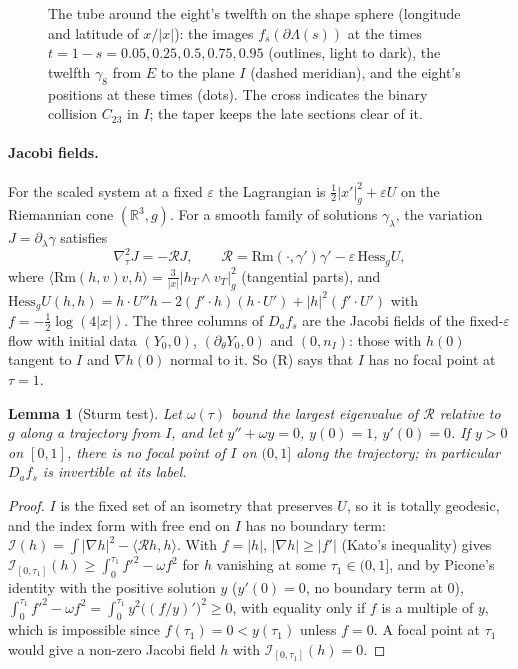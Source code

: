 \documentclass[11pt]{article}
\newtheorem{lemma}[theorem]{Lemma}
\theoremstyle{definition}
\begin{document}
\begin{figure}[t]\centering
\figtube
\caption{The tube around the eight's twelfth on the shape sphere (longitude and latitude of $x/|x|$): the images
$f_s(\partial\Lambda(s))$ at the times $t=1-s=0.05,0.25,0.5,0.75,0.95$ (outlines, light to dark), the twelfth
$\gamma_8$ from $E$ to the plane $I$ (dashed meridian), and the eight's positions at these times (dots). The cross
indicates the binary collision $C_{23}$ in $I$; the taper keeps the late sections clear of it.}\label{fig:tube}
\end{figure}

\paragraph{Jacobi fields.} For the scaled system at a fixed $\varepsilon$ the Lagrangian is
$\tfrac12|x'|_g^2+\varepsilon U$ on the Riemannian cone $(\mathbb R^3,g)$. For a smooth family of solutions
$\gamma_\lambda$, the variation $J=\partial_\lambda\gamma$ satisfies
\[
\nabla_\tau^2J=-\mathcal R J,\qquad \mathcal R=\mathrm{Rm}(\cdot,\gamma')\gamma'-\varepsilon\,\mathrm{Hess}_gU,
\]
where $\langle\mathrm{Rm}(h,v)v,h\rangle=\frac3{|x|}|h_T\wedge v_T|_g^2$ (tangential parts), and
$\mathrm{Hess}_gU(h,h)=h\cdot U''h-2(f'\cdot h)(h\cdot U')+|h|^2(f'\cdot U')$ with $f=-\tfrac12\log(4|x|)$. The three
columns of $D_af_s$ are the Jacobi fields of the fixed-$\varepsilon$ flow with initial data $(Y_0,0)$,
$(\partial_\theta Y_0,0)$ and $(0,n_I)$: those with $h(0)$ tangent to $I$ and $\nabla h(0)$ normal to it. So (R) says
that $I$ has no focal point at $\tau=1$.

\begin{lemma}[Sturm test]\label{lem:sturm}
Let $\omega(\tau)$ bound the largest eigenvalue of $\mathcal R$ relative to $g$ along a trajectory from $I$, and let
$y''+\omega y=0$, $y(0)=1$, $y'(0)=0$. If $y>0$ on $[0,1]$, there is no focal point of $I$ on $(0,1]$ along the
trajectory; in particular $D_af_s$ is invertible at its label.
\end{lemma}
\begin{proof}
$I$ is the fixed set of an isometry that preserves $U$, so it is totally geodesic, and the index form with free end on
$I$ has no boundary term: $\mathcal I(h)=\int|\nabla h|^2-\langle\mathcal Rh,h\rangle$. With $f=|h|$,
$|\nabla h|\ge|f'|$ (Kato's inequality) gives $\mathcal I_{[0,\tau_1]}(h)\ge\int_0^{\tau_1}f'^2-\omega f^2$ for $h$ vanishing
at some $\tau_1\in(0,1]$, and by Picone's identity with the positive solution $y$ ($y'(0)=0$, no boundary term at
$0$), $\int_0^{\tau_1}f'^2-\omega f^2=\int_0^{\tau_1}y^2\bigl((f/y)'\bigr)^2\ge0$, with equality only if $f$ is a multiple of
$y$, which is impossible since $f(\tau_1)=0<y(\tau_1)$ unless $f=0$. A focal point at $\tau_1$ would give a non-zero
Jacobi field $h$ with $\mathcal I_{[0,\tau_1]}(h)=0$.
\end{proof}
\end{document}
